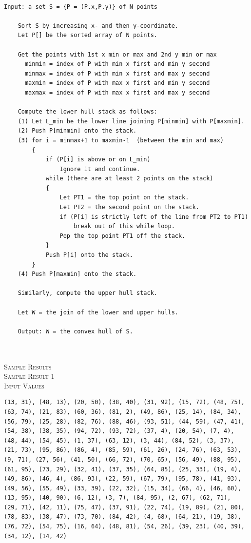 \documentclass[pdftex,12pt,a4paper]{article}
\newcommand{\nspace}{\\[0.25cm]}
\newcommand{\Lspace}{\\[1.0cm]}
\begin{document}
\begin{verbatim}

Input: a set S = {P = (P.x,P.y)} of N points

    Sort S by increasing x- and then y-coordinate.
    Let P[] be the sorted array of N points.

    Get the points with 1st x min or max and 2nd y min or max
      minmin = index of P with min x first and min y second
      minmax = index of P with min x first and max y second
      maxmin = index of P with max x first and min y second
      maxmax = index of P with max x first and max y second

    Compute the lower hull stack as follows:
    (1) Let L_min be the lower line joining P[minmin] with P[maxmin].
    (2) Push P[minmin] onto the stack.
    (3) for i = minmax+1 to maxmin-1  (between the min and max)
        {
            if (P[i] is above or on L_min)
                Ignore it and continue.
            while (there are at least 2 points on the stack)
            {
                Let PT1 = the top point on the stack.
                Let PT2 = the second point on the stack.
                if (P[i] is strictly left of the line from PT2 to PT1)
                    break out of this while loop.
                Pop the top point PT1 off the stack.
            }
            Push P[i] onto the stack.
        }
    (4) Push P[maxmin] onto the stack.

    Similarly, compute the upper hull stack.

    Let W = the join of the lower and upper hulls.

    Output: W = the convex hull of S.
    
\end{verbatim}

\hfill \Lspace




\textsc{\Large Sample Results} \hfill \nspace

\textsc{\large Sample Result 1} \hfill \nspace

\textsc{Input Values} \hfill \nspace

\begin{verbatim}
(13, 31), (48, 13), (20, 50), (38, 40), (31, 92), (15, 72), (48, 75), 
(63, 74), (21, 83), (60, 36), (81, 2), (49, 86), (25, 14), (84, 34), 
(56, 79), (25, 28), (82, 76), (88, 46), (93, 51), (44, 59), (47, 41), 
(54, 38), (38, 35), (94, 72), (93, 72), (37, 4), (20, 54), (7, 4), 
(48, 44), (54, 45), (1, 37), (63, 12), (3, 44), (84, 52), (3, 37), 
(21, 73), (95, 86), (86, 4), (85, 59), (61, 26), (24, 76), (63, 53), 
(9, 71), (27, 56), (41, 50), (66, 72), (70, 65), (56, 49), (88, 95), 
(61, 95), (73, 29), (32, 41), (37, 35), (64, 85), (25, 33), (19, 4), 
(49, 86), (46, 4), (86, 93), (22, 59), (67, 79), (95, 78), (41, 93), 
(49, 56), (55, 49), (33, 39), (22, 32), (15, 34), (66, 4), (46, 60), 
(13, 95), (40, 90), (6, 12), (3, 7), (84, 95), (2, 67), (62, 71), 
(29, 71), (42, 11), (75, 47), (37, 91), (22, 74), (19, 89), (21, 80), 
(78, 83), (38, 47), (73, 70), (84, 42), (4, 68), (64, 21), (19, 38), 
(76, 72), (54, 75), (16, 64), (48, 81), (54, 26), (39, 23), (40, 39), 
(34, 12), (14, 42)
\end{verbatim}
\end{document}
